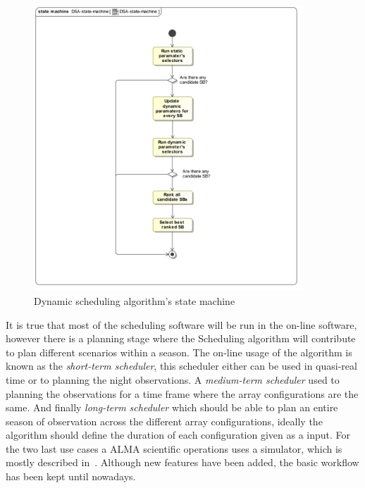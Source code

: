 \begin{figure}	
\begin{center}
\includegraphics[width=0.9\textwidth]{images/DSA-state-machine}
\caption{Dynamic scheduling algorithm's state machine}
\label{fig:sched-dsa-state-machine}
\end{center}
\end{figure}


It is true that most of the scheduling software will be run in the on-line software, however there is a planning stage where the Scheduling algorithm will contribute to plan different scenarios within a season. The on-line usage of the algorithm is known as the \textit{short-term scheduler}, this scheduler either can be used in quasi-real time or to planning the night observations. A \textit{medium-term scheduler} used to planning the observations for a time frame where the array configurations are the same. And finally \textit{long-term scheduler} which should be able to plan an entire season of observation across the different array configurations, ideally the algorithm should define the duration of each configuration given as a input. For the two last use cases a ALMA scientific operations uses a simulator, which is mostly described in~\cite{hoffstadt10}. Although new features have been added, the basic workflow has been kept until nowadays.